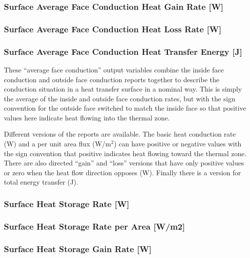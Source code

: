 \subsubsection{Surface Average Face Conduction Heat Gain Rate {[}W{]}}\label{surface-average-face-conduction-heat-gain-rate-w}

\subsubsection{Surface Average Face Conduction Heat Loss Rate {[}W{]}}\label{surface-average-face-conduction-heat-loss-rate-w}

\subsubsection{Surface Average Face Conduction Heat Transfer Energy {[}J{]}}\label{surface-average-face-conduction-heat-transfer-energy-j}

These ``average face conduction'' output variables combine the inside face conduction and outside face conduction reports together to describe the conduction situation in a heat transfer surface in a nominal way. This is simply the average of the inside and outside face conduction rates, but with the sign convention for the outside face switched to match the inside face so that positive values here indicate heat flowing into the thermal zone.

Different versions of the reports are available. The basic heat conduction rate (W) and a per unit area flux (W/m\(^{2}\)) can have positive or negative values with the sign convention that positive indicates heat flowing toward the thermal zone. There are also directed ``gain'' and ``loss'' versions that have only positive values or zero when the heat flow direction opposes (W). Finally there is a version for total energy transfer (J).

\subsubsection{Surface Heat Storage Rate {[}W{]}}\label{surface-heat-storage-rate-w}

\subsubsection{Surface Heat Storage Rate per Area {[}W/m2{]}}\label{surface-heat-storage-rate-per-area-wm2}

\subsubsection{Surface Heat Storage Gain Rate {[}W{]}}\label{surface-heat-storage-gain-rate-w}

